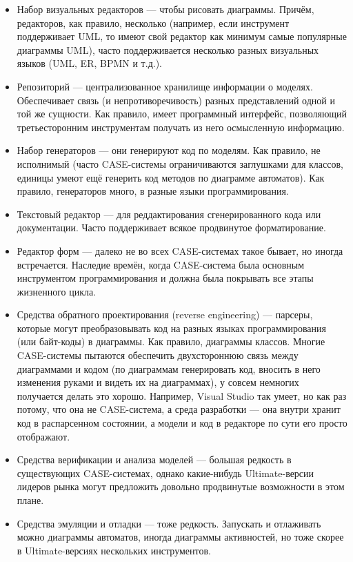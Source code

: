 \documentclass[a5paper]{article}
\begin{document}
\begin{itemize}
    \item Набор визуальных редакторов --- чтобы рисовать диаграммы. Причём, редакторов, как правило, несколько (например, если инструмент поддерживает UML, то имеют свой редактор как минимум самые популярные диаграммы UML), часто поддерживается несколько разных визуальных языков (UML, ER, BPMN и т.д.).
    \item Репозиторий --- централизованное хранилище информации о моделях. Обеспечивает связь (и непротиворечивость) разных представлений одной и той же сущности. Как правило, имеет программный интерфейс, позволяющий третьесторонним инструментам получать из него осмысленную информацию.
    \item Набор генераторов --- они генерируют код по моделям. Как правило, не исполнимый (часто CASE-системы ограничиваются заглушками для классов, единицы умеют ещё генерить код методов по диаграмме автоматов). Как правило, генераторов много, в разные языки программирования.
    \item Текстовый редактор --- для реддактирования сгенерированного кода или документации. Часто поддерживает всякое продвинутое форматирование.
    \item Редактор форм --- далеко не во всех CASE-системах такое бывает, но иногда встречается. Наследие времён, когда CASE-система была основным инструментом программирования и должна была покрывать все этапы жизненного цикла.
    \item Средства обратного проектирования (reverse engineering) --- парсеры, которые могут преобразовывать код на разных языках программирования (или байт-коды) в диаграммы. Как правило, диаграммы классов. Многие CASE-системы пытаются обеспечить двухстороннюю связь между диаграммами и кодом (по диаграммам генерировать код, вносить в него изменения руками и видеть их на диаграммах), у совсем немногих получается делать это хорошо. Например, Visual Studio так умеет, но как раз потому, что она не CASE-система, а среда разработки --- она внутри хранит код в распарсенном состоянии, а модели и код в редакторе по сути его просто отображают.
    \item Средства верификации и анализа моделей --- большая редкость в существующих CASE-системах, однако какие-нибудь Ultimate-версии лидеров рынка могут предложить довольно продвинутые возможности в этом плане.
    \item Средства эмуляции и отладки --- тоже редкость. Запускать и отлаживать можно диаграммы автоматов, иногда диаграммы активностей, но тоже скорее в Ultimate-версиях нескольких инструментов.

\end{itemize}
\end{document}
